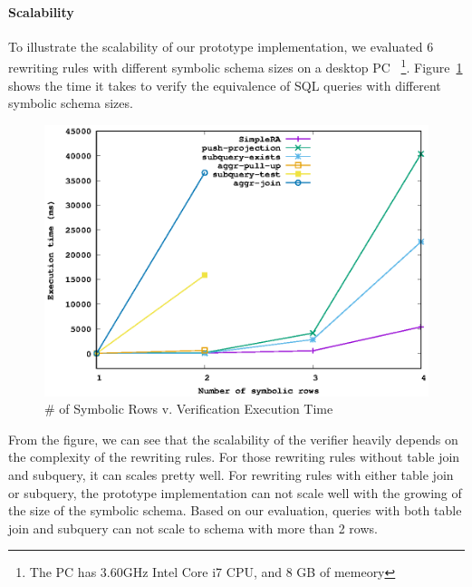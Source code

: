 \paragraph{Scalability}
To illustrate the scalability of our prototype implementation, we evaluated
6 rewriting rules with different symbolic schema sizes on a desktop PC
~\footnote{The PC has 3.60GHz Intel Core i7 CPU, and 8 GB of memeory}.
Figure~\ref{fig:scale} shows the time it takes to verify the equivalence of SQL queries
with different symbolic schema sizes.

\begin{figure}[!htb]
  \centering
  \includegraphics[width=0.7\linewidth]{scale.eps}
  \caption{\# of Symbolic Rows v. Verification Execution Time}
  \label{fig:scale}
\end{figure}

From the figure, we can see that the scalability of the verifier heavily depends 
on the complexity of the rewriting rules.
For those rewriting rules without table join and subquery, it can scales pretty well.
For rewriting rules with either table join or subquery, the prototype implementation can 
not scale well with the growing of the size of the symbolic schema.
Based on our evaluation, queries with both table join and subquery can not scale to schema with
more than 2 rows.

